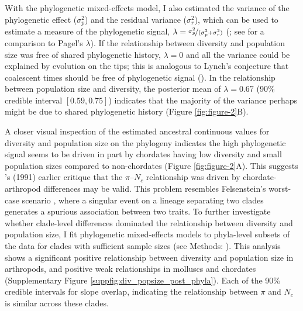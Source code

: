 \documentclass[11pt]{article}
\newcommand{\Newnameref}[1]{\textit{\nameref{#1}}}
\begin{document}
With the phylogenetic mixed-effects model, I also estimated the variance of the
phylogenetic effect ($\sigma_p^2$) and the residual variance ($\sigma_r^2$),
which can be used to estimate a measure of the phylogenetic signal, $\lambda =
\nicefrac{\sigma_p^2}{(\sigma_p^2 + \sigma_r^2)}$
(\cite{Lynch1991-tp,De_Villemereuil2014-kt}; see \cite{Freckleton2002-ly} for a
comparison to Pagel's $\lambda$).  If the relationship between diversity and
population size was free of shared phylogenetic history, $\lambda = 0$ and all
the variance could be explained by evolution on the tips; this is analogous to
Lynch's conjecture that coalescent times should be free of phylogenetic signal
(\citeyear{Lynch2011-qv}). In the relationship between population size and
diversity, the posterior mean of $\lambda = 0.67$ (90\% credible interval
$[0.59, 0.75]$) indicates that the majority of the variance perhaps might be
due to shared phylogenetic history (Figure \ref{fig:figure-2}B).

A closer visual inspection of the estimated ancestral continuous values for
diversity and population size on the phylogeny indicates the high phylogenetic
signal seems to be driven in part by chordates having low diversity and small
population sizes compared to non-chordates (Figure \ref{fig:figure-2}A). This
suggests \citeauthor{Gillespie1991-qa}'s (1991) earlier critique that the
$\pi$--$N_c$ relationship was driven by chordate-arthropod differences may be
valid. This problem resembles Felsenstein's worst-case scenario
\parencite{Felsenstein1985-an,Uyeda2018-wf}, where a singular event on a
lineage separating two clades generates a spurious association between two
traits. To further investigate whether clade-level differences dominated the
relationship between diversity and population size, I fit phylogenetic
mixed-effects models to phyla-level subsets of the data for clades with
sufficient sample sizes (see Methods: \Newnameref{sec:methods-pcm}). This
analysis shows a significant positive relationship between diversity and
population size in arthropods, and positive weak relationships in molluscs and
chordates (Supplementary Figure \ref{suppfig:div_popsize_post_phyla}). Each of
the 90\% credible intervals for slope overlap, indicating the relationship
between $\pi$ and $N_c$ is similar across these clades.
\end{document}

